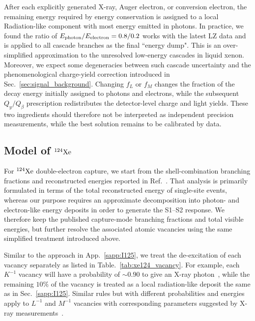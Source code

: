 \documentclass[11pt,a4paper]{article}
\begin{document}
After each explicitly generated X-ray, Auger electron, or conversion electron, the remaining energy required by energy conservation is assigned to a local Radiation-like component with most energy emitted in photons. In practice, we found the ratio of $E_{\rm photon}/E_{\rm electron} = 0.8/0.2$ works with the latest LZ data and is applied to all cascade branches as the final ``energy dump". This is an over-simplified approximation to the unresolved low-energy cascades in liquid xenon. Moreover, we expect some degeneracies between such cascade uncertainty and the phenomenological charge-yield correction introduced in Sec.~\ref{sec:signal_background}. Changing $f_L$ or $f_M$ changes the fraction of the decay energy initially assigned to photons and electrons, while the subsequent $Q_y/Q_\beta$ prescription redistributes the detector-level charge and light yields. These two ingredients should therefore not be interpreted as independent precision measurements, while the best solution remains to be calibrated by data.


\subsection{Model of $^{124} {\rm Xe}$}
\label{sapp:Xe124}
For $^{124}{\rm Xe}$ double-electron capture, we start from the shell-combination branching fractions and reconstructed energies reported in Ref.~\cite{LZ:2024wvs}. That analysis is primarily formulated in terms of the total reconstructed energy of single-site events, whereas our purpose requires an approximate decomposition into photon- and electron-like energy deposits in order to generate the S1--S2 response. We therefore keep the published capture-mode branching fractions and total visible energies, but further resolve the associated atomic vacancies using the same simplified treatment introduced above.

Similar to the approach in App.~\ref{sapp:I125}, we treat the de-excitation of each vacancy separately as listed in Table.~\ref{tab:xe124_vacancy}. For example, each $K^{-1}$ vacancy will have a probability of $\sim 0.90$ to give an X-ray photon~\cite{XrayDBXe}, while the remaining $10\%$ of the vacancy is treated as a local radiation-like deposit the same as in Sec.~\ref{sapp:I125}. Similar rules but with different probabilities and energies apply to $L^{-1}$ and $M^{-1}$ vacancies with corresponding parameters suggested by X-ray measurements~\cite{XrayDBXe}.
\end{document}

